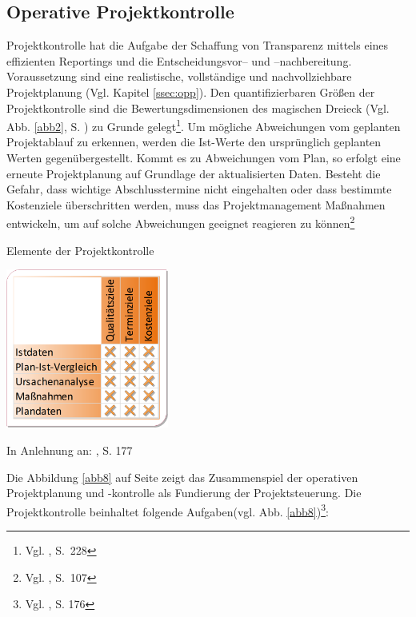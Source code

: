 \subsection{Operative Projektkontrolle}
Projektkontrolle hat die Aufgabe der Schaffung von Transparenz mittels eines effizienten Reportings und die Entscheidungsvor-- und --nachbereitung.\\Voraussetzung sind eine realistische, vollständige und nachvollziehbare Projektplanung (Vgl. Kapitel \ref{ssec:opp}). Den quantifizierbaren Größen der Projektkontrolle sind die Bewertungsdimensionen des magischen Dreieck (Vgl. Abb. \ref{abb2}, S. \pageref{abb2}) zu Grunde gelegt\footnote{Vgl. \cite{Bergmann&Garrecht2008}, S.~228}. Um mögliche Abweichungen vom geplanten Projektablauf zu erkennen, werden die Ist-Werte den ursprünglich geplanten Werten gegenübergestellt. Kommt es zu Abweichungen vom Plan, so erfolgt eine erneute Projektplanung auf Grundlage der aktualisierten Daten. Besteht die Gefahr, dass wichtige Abschlusstermine nicht eingehalten oder dass bestimmte Kostenziele überschritten werden, muss das Projektmanagement Maßnahmen entwickeln, um auf solche Abweichungen geeignet reagieren zu können\footnote{Vgl. \cite{Zimmermann&Rieck&Stark2006}, S.~107}
\begin{table}
\begin{center}
\caption[Elemente der Projektkontrolle]{Elemente der Projektkontrolle}

\includegraphics[width=0.4\textwidth]{Images/elementeSteuerung.png}
\label{tbl2}

   {\footnotesize In Anlehnung an: \cite{Fiedler2008}, S. 177}
\end{center}

\end{table}
Die Abbildung \ref{abb8} auf Seite \pageref{abb8} zeigt das Zusammenspiel der operativen Projektplanung und -kontrolle als Fundierung der Projektsteuerung. 
Die Projektkontrolle beinhaltet folgende Aufgaben(vgl. Abb. \ref{abb8})\footnote{Vgl. \cite{Fiedler2008}, S. 176}:
